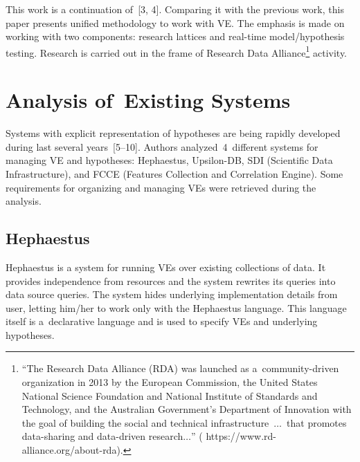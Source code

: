 \begin{multicols}{2}
      This work is a continuation of~[3, 4]. Comparing it with the previous work, 
this paper presents unified methodology to work with VE. The emphasis is made on 
working with two components: research lattices and real-time model/hypothesis 
testing. Research is carried out in the frame of Research Data 
Alliance\footnote[3]{``The Research Data Alliance (RDA) was launched as 
a~community-driven organization in 2013 by the European Commission, the United 
States National Science Foundation and National Institute of Standards and 
Technology, and the Australian Government's Department of Innovation with the 
goal of building the social and technical infrastructure\ $\ldots$\ that promotes 
data-sharing and data-driven research$\ldots$'' ({\sf  
https://www.rd-alliance.org/about-rda)}.} activity.
      
      
      \vspace*{-4pt}
      
\section{Analysis of~Existing Systems}

\vspace*{-2pt}

      \noindent
      Systems with explicit representation of hypotheses are being rapidly 
developed during last several years~[5--10]. Authors analyzed~4~different systems 
for managing VE and hypotheses: Hephaestus, Upsilon-DB, SDI
(Scientific Data Infrastructure), and FCCE (Features Collection and
Correlation Engine). Some 
requirements for organizing and managing VEs were retrieved during 
the analysis.

\vspace*{-9pt}

\subsection{Hephaestus}

\vspace*{-2pt}

      \noindent
      Hephaestus is a system for running VEs over existing 
collections of data. It provides independence from resources and the system rewrites 
its queries into data source queries. The system hides underlying implementation 
details from user, letting him/her to work only with the Hephaestus language. This language 
itself is a~declarative language and is used to specify VEs and 
underlying hypotheses.
      

\end{multicols}
